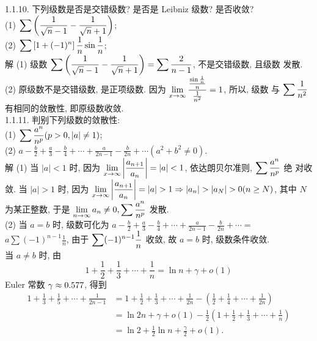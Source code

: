 \documentclass[a4paper,11pt,UTF8]{article}
\begin{document}
1.1.10. 下列级数是否是交错级数? 是否是 Leibniz 级数? 是否收敛?\\
(1) $\displaystyle \displaystyle \displaystyle \sum\left(\frac{1}{\sqrt{n}-1}-\frac{1}{\sqrt{n}+1}\right)$;\\
(2) $\displaystyle \displaystyle \displaystyle \sum\left[1+(-1)^n\right] \frac{1}{n} \sin \frac{1}{n}$;\\
解 (1) 级数 $\displaystyle \displaystyle \displaystyle \sum\left(\frac{1}{\sqrt{n}-1}-\frac{1}{\sqrt{n}+1}\right)=\sum \frac{2}{n-1}$, 不是交错级数, 且级数 发散.\\
(2) 原级数不是交错级数, 是正项级数. 因为 $\displaystyle \displaystyle \displaystyle \lim _{x \rightarrow \infty} \frac{\frac{\sin \frac{1}{n}}{n}}{\frac{1}{n^2}}=1$, 所以, 级数 与 $\displaystyle \displaystyle \displaystyle \sum \frac{1}{n^2}$ 有相同的敛散性, 即原级数收敛.\\
1.1.11. 判别下列级数的敛散性:\\
(1) $\displaystyle \displaystyle \displaystyle \sum \frac{a^n}{n^p}(p>0,|a| \neq 1)$;\\
(2) $a-\frac{b}{2}+\frac{a}{3}-\frac{b}{4}+\cdots+\frac{a}{2 n-1}-\frac{b}{2 n}+\cdots\left(a^2+b^2 \neq 0\right)$.\\
解 (1) 当 $|a|<1$ 时, 因为 $\displaystyle \displaystyle \displaystyle \lim _{x \rightarrow \infty}\left|\frac{a_{n+1}}{a_n}\right|=|a|<1$, 依达朗贝尔准则, $\displaystyle \displaystyle \displaystyle \sum \frac{a^n}{n^p}$ 绝 对收敛. 当 $|a|>1$ 时, 因为 $\displaystyle \displaystyle \displaystyle \lim _{x \rightarrow \infty}\left|\frac{a_{n+1}}{a_n}\right|=|a|>1 \Rightarrow\left|a_n\right|>\left|a_N\right|>0(n \geq N)$, 其中 $N$ 为某正整数, 于是 $\displaystyle \displaystyle \displaystyle \lim _{n \rightarrow \infty} a_n \neq 0, \sum \frac{a^n}{n^p}$ 发散.\\
(2) 当 $a=b$ 时, 级数可化为 $a-\frac{b}{2}+\frac{a}{3}-\frac{b}{4}+\cdots+\frac{a}{2 n-1}-\frac{b}{2 n}+\cdots=$ $a \sum(-1)^{n-1} \frac{1}{n}$, 由于 $\displaystyle \displaystyle \displaystyle \sum(-1)^{n-1} \frac{1}{n}$ 收敛, 故 $a=b$ 时, 级数条件收敛.\\
当 $a \neq b$ 时, 由
$$
1+\frac{1}{2}+\frac{1}{3}+\cdots+\frac{1}{n}=\ln n+\gamma+o(1)
$$
Euler 常数 $\displaystyle \displaystyle \displaystyle \gamma \approx 0.577$, 得到
$$
\begin{aligned}
	1+\frac{1}{3}+\frac{1}{5}+\cdots+\frac{1}{2 n-1} & =1+\frac{1}{2}+\frac{1}{3}+\cdots+\frac{1}{2 n}-\left(\frac{1}{2}+\frac{1}{4}+\cdots+\frac{1}{2 n}\right) \\
	& =\ln 2 n+\gamma+o(1)-\frac{1}{2}\left(1+\frac{1}{2}+\frac{1}{3}+\cdots+\frac{1}{n}\right) \\
	& =\ln 2+\frac{1}{2} \ln n+\frac{\gamma}{2}+o(1) .
\end{aligned}
$$
\end{document}
